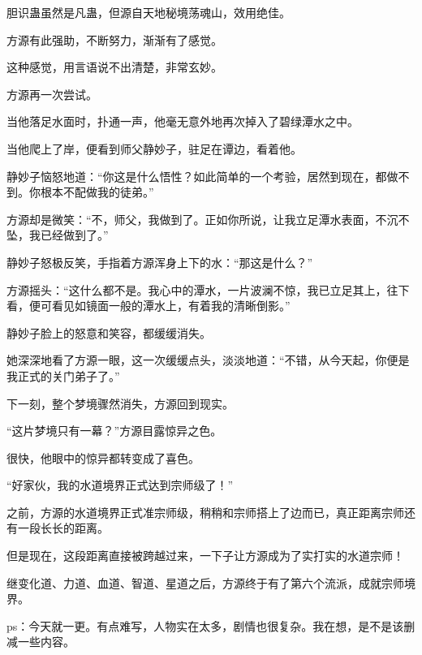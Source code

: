 \begin{this_body}
胆识蛊虽然是凡蛊，但源自天地秘境荡魂山，效用绝佳。

方源有此强助，不断努力，渐渐有了感觉。

这种感觉，用言语说不出清楚，非常玄妙。

方源再一次尝试。

当他落足水面时，扑通一声，他毫无意外地再次掉入了碧绿潭水之中。

当他爬上了岸，便看到师父静妙子，驻足在谭边，看着他。

静妙子恼怒地道：“你这是什么悟性？如此简单的一个考验，居然到现在，都做不到。你根本不配做我的徒弟。”

方源却是微笑：“不，师父，我做到了。正如你所说，让我立足潭水表面，不沉不坠，我已经做到了。”

静妙子怒极反笑，手指着方源浑身上下的水：“那这是什么？”

方源摇头：“这什么都不是。我心中的潭水，一片波澜不惊，我已立足其上，往下看，便可看见如镜面一般的潭水上，有着我的清晰倒影。”

静妙子脸上的怒意和笑容，都缓缓消失。

她深深地看了方源一眼，这一次缓缓点头，淡淡地道：“不错，从今天起，你便是我正式的关门弟子了。”

下一刻，整个梦境骤然消失，方源回到现实。

“这片梦境只有一幕？”方源目露惊异之色。

很快，他眼中的惊异都转变成了喜色。

“好家伙，我的水道境界正式达到宗师级了！”

之前，方源的水道境界正式准宗师级，稍稍和宗师搭上了边而已，真正距离宗师还有一段长长的距离。

但是现在，这段距离直接被跨越过来，一下子让方源成为了实打实的水道宗师！

继变化道、力道、血道、智道、星道之后，方源终于有了第六个流派，成就宗师境界。

ps：今天就一更。有点难写，人物实在太多，剧情也很复杂。我在想，是不是该删减一些内容。

\end{this_body}

